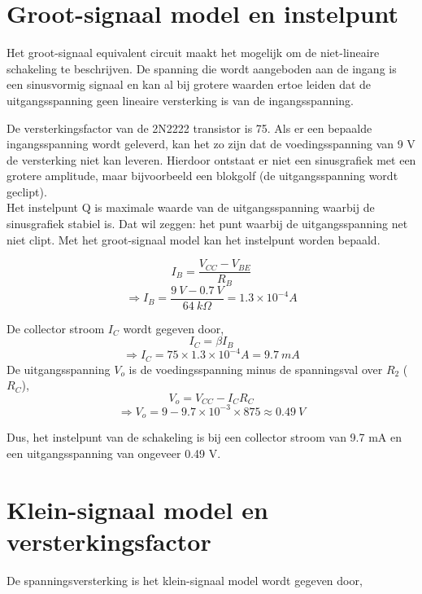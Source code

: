 \documentclass[11pt]{article}
\begin{document}
\section{Groot-signaal model en instelpunt}

Het groot-signaal equivalent circuit maakt het mogelijk om de niet-lineaire schakeling te beschrijven. De spanning die wordt aangeboden aan de ingang is een sinusvormig signaal en kan al bij grotere waarden ertoe leiden dat de uitgangsspanning geen lineaire versterking is van de ingangsspanning.

De versterkingsfactor van de 2N2222 transistor is 75. Als er een bepaalde ingangsspanning wordt geleverd, kan het zo zijn dat de voedingsspanning van 9 V de versterking niet kan leveren. Hierdoor ontstaat er niet een sinusgrafiek met een grotere amplitude, maar bijvoorbeeld een blokgolf (de uitgangsspanning wordt geclipt).\\

Het instelpunt Q is maximale waarde van de uitgangsspanning waarbij de sinusgrafiek stabiel is. Dat wil zeggen: het punt waarbij de uitgangsspanning net niet clipt. Met het groot-signaal model kan het instelpunt worden bepaald.

\begin{equation}
I_B=\frac{V_{CC}-V_{BE}}{R_B}
\end{equation}
$$\Rightarrow I_B=\frac{9\: V-0.7 \: V}{64 \: k \Omega}=1.3\times 10^{-4}A$$

De collector stroom $I_C$ wordt gegeven door, 
\begin{equation}
I_C=\beta I_B
\end{equation}
$$\Rightarrow I_C=75 \times 1.3\times 10^{-4}A=9.7 \: mA$$
De uitgangsspanning $V_o$ is de voedingsspanning minus de spanningsval over $R_2$ ($R_C$),
\begin{equation}
V_o=V_{CC}-I_{C}R_{C}
\end{equation}
$$\Rightarrow V_o=9-9.7\times 10^{-3}\times 875\approx 0.49 \: V$$

\noindent Dus, het instelpunt van de schakeling is bij een collector stroom van 9.7 mA en een uitgangsspanning van ongeveer 0.49 V.

\newpage
\section{Klein-signaal model en versterkingsfactor}

De spanningsversterking is het klein-signaal model wordt gegeven door,
\end{document}
